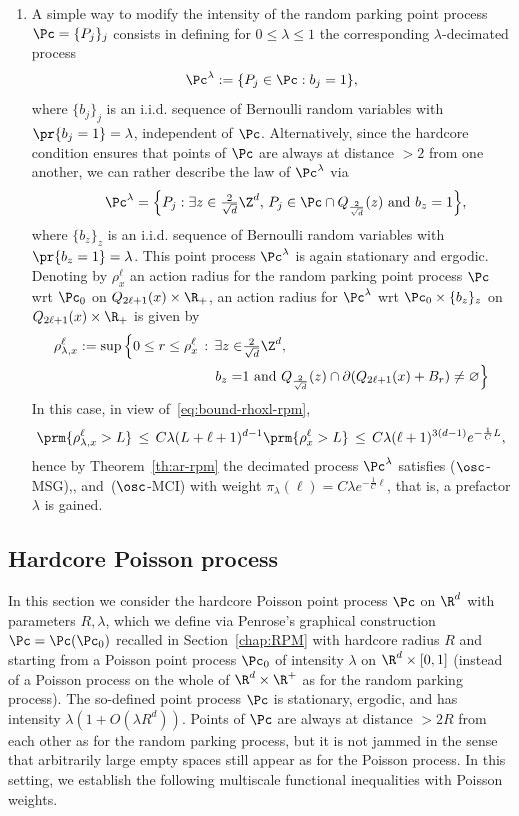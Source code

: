 \begin{rema}
\begin{enumerate}
\item \label{rema3.4.2}A simple way to modify the intensity of the random parking point process $\Pc=\{P_j\}_j$ consists in defining for $0\le\lambda \le1$ the corresponding $\lambda$-decimated process
\[
\Pc^\lambda:=\{P_j\in\Pc:b_j=1\},
\]
where $\{b_j\}_j$ is an i.i.d. sequence of Bernoulli random variables with $\pr{b_j=1}\linebreak=\lambda$, independent of $\Pc$. Alternatively, since the hardcore condition ensures that points of $\Pc$ are always at distance $>2$ from one another, we can rather describe the law of $\Pc^\lambda$ via
\[
\qquad\Pc^\lambda=\Big\{P_j:\exists z\in\tfrac2{\sqrt d}\Z^d,\, P_j \in\Pc \cap Q_{\frac2{\sqrt{d}}}(z)\text{ and }b_z=1\Big\},
\]
where $\{b_z\}_z$ is an i.i.d. sequence of Bernoulli random variables with $\pr{b_z=1}\linebreak=\lambda$. This point process $\Pc^\lambda$ is again stationary and ergodic. Denoting by $\rho_x^\ell$ an action radius for the random parking point process $\Pc$ wrt $\Pc_0$ on $Q_{2\ell+1}(x)\times\R_+$, an action radius for $\Pc^\lambda$ wrt $\Pc_0\times\{b_z\}_z$ on $Q_{2\ell+1}(x)\times\R_+$ is given by
\begin{align*}
\rho_{\lambda,x}^\ell := \sup\Big\{0\le r\le \rho_x^\ell \,:\, \exists z\in& \tfrac2{\sqrt d} \Z^d,\\
b_z=&1\text{ and }Q_{\frac2{\sqrt{d}}}(z)\cap\partial(Q_{2\ell+1}(x)+B_r)\ne\varnothing\Big\}
\end{align*}
In this case, in view of~\eqref{eq:bound-rhoxl-rpm},
\[
\prm{\rho_{\lambda,x}^\ell>L}\,\le\,C\lambda(L+\ell+1)^{d-1}\prm{\rho_{x}^\ell>L}\,\le\,C\lambda(\ell+1)^{3(d-1)}e^{-\frac1CL},
\]
hence by Theorem~\ref{th:ar-rpm} the decimated process $\Pc^\lambda$ satisfies {($\osc$-MSG)},, and~{($\osc$-MCI)} with weight $\pi_\lambda(\ell)=C\lambda e^{-\frac1{C}\ell}$, that is, a prefactor $\lambda$ is gained.
\qedhere
\end{enumerate}
\end{rema}


\subsection{Hardcore Poisson process}\label{sec:hardcore}
In this section we consider the hardcore Poisson point process $\Pc$ on $\R^d$ with parameters $R,\lambda$, which we define via Penrose's graphical construction $\Pc=\Pc(\Pc_0)$ recalled in Section~\ref{chap:RPM} with hardcore radius $R$ and starting from a Poisson point process $\Pc_0$ of intensity $\lambda$ on $\R^d\times [0,1]$ (instead of a Poisson process on the whole of $\R^d\times\R^+$ as for the random parking process). The so-defined point process $\Pc$ is stationary, ergodic, and has intensity $\lambda(1+O(\lambda R^d))$. Points of $\Pc$ are always at distance $>2R$ from each other as for the random parking process, but it is not jammed in the sense that arbitrarily large empty spaces still appear as for the Poisson process. In this setting, we establish the following multiscale functional inequalities with Poisson weights.

